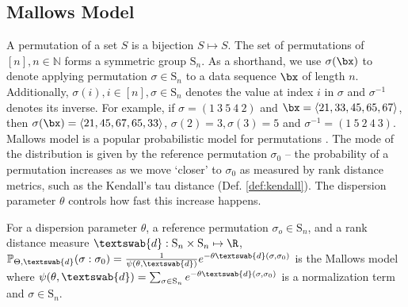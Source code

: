 
\subsection{Mallows Model} \label{sec:background:MM}
A permutation of a set $S$ is a bijection $S\mapsto S$. The set of permutations of $[n], n \in \mathbb{N}$ forms a symmetric group $\mathrm{S}_n$. As a shorthand, we use $\sigma(\bx)$ to denote applying permutation $\sigma \in \mathrm{S}_n$ to a data sequence $\bx$ of length $n$. Additionally, $\sigma(i), i\in [n], \sigma \in \mathrm{S}_n$ denotes the value at index $i$ in $\sigma$ and $\sigma^{-1}$ denotes its inverse. For example, if $\sigma=( 1 \: 3 \: 5\: 4\: 2)$ and $\bx=\langle 21, 33, 45, 65 , 67\rangle$, then $\sigma(\bx)=\langle 21, 45, 67, 65, 33\rangle$, $\sigma(2)=3, \sigma(3)=5$ and $\sigma^{-1}=(1 \: 5 \: 2 \: 4 \: 3)$.
\\Mallows model is a popular probabilistic model for permutations \citep{MM}.  %
The mode of the distribution is given
by the reference permutation $\sigma_0$ -- the probability of a permutation increases as we move `closer' to $\sigma_0$ as measured by rank distance metrics, such as the Kendall's tau distance (Def. \ref{def:kendall}). The dispersion parameter $\theta$ controls how fast this increase happens.  %
\begin{defn}
\label{def: mallows}
For a dispersion parameter $\theta$, a reference permutation $\sigma_o \in \mathrm{S}_n$, and a rank distance measure $\textswab{d}: \mathrm{S}_n \times \mathrm{S}_n \mapsto \R $,   
$
\mathbb{P}_{\Theta,\textswab{d}}(\sigma:\sigma_0)=\frac{1}{\psi(\theta,\textswab{d})} e^{-\theta  \textswab{d}(\sigma, \sigma_0)}$
is the Mallows model where $\psi(\theta,\textswab{d})=\sum_{\sigma \in \mathrm{S}_n} e^{-\theta \textswab{d}(\sigma,\sigma_0)}$ is a normalization term and  $\sigma \in \mathrm{S}_n$.
\end{defn}





